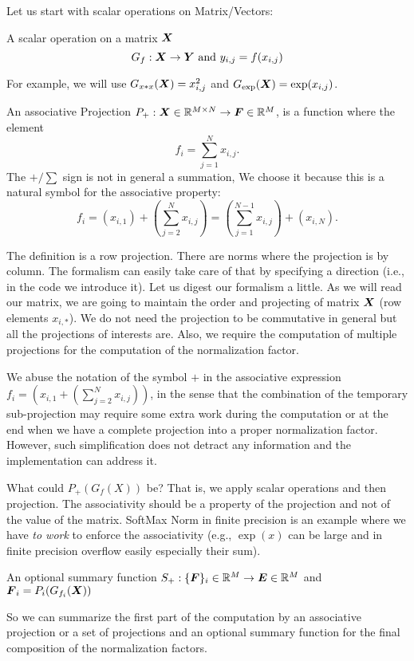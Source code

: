 \documentclass[acmsmall]{acmart}
\begin{document}
Let us start with scalar operations on Matrix/Vectors:
\begin{definition}
  A scalar operation on a matrix ${\boldsymbol X}$
  \begin{equation}
    G_f: {\boldsymbol X} \rightarrow {\boldsymbol Y} \text{ and }  y_{i,j} = f(x_{i,j})
  \end{equation}
\end{definition}

For example, we will use $G_{x*x}({\boldsymbol X}) = x_{i,j}^2$ and
$G_{\exp}({\boldsymbol X}) = \exp(x_{i,j})$. 


\begin{definition}
An associative Projection $P_+: {\boldsymbol X}\in\mathbb{R}^{M\times N} \rightarrow
{\boldsymbol F} \in \mathbb{R}^{M}$, is a function where the element
\[ f_i = \sum_{j=1}^N x_{i,j}. \]
The $+/\sum$ sign is not in general a summation, We choose it because
this is a natural symbol for the associative property:
\[
f_i = (x_{i,1}) + (\sum_{j=2}^N x_{i,j}) = (\sum_{j=1}^{N-1} x_{i,j}) + (x_{i,N}).
\]

\end{definition}
The definition is a row projection.  There are norms where the
projection is by column. The formalism can easily take care of that by
specifying a direction (i.e., in the code we introduce it).  Let us
digest our formalism a little.  As we will read our matrix, we are
going to maintain the order and projecting of matrix ${\boldsymbol X}$ (row
elements $x_{i,*}$). We do not need the projection to be commutative
in general but all the projections of interests are. Also, we require
the computation of multiple projections for the computation of the
normalization factor.

We abuse the notation of the symbol $+$ in the associative expression
$f_i = (x_{i,1} + (\sum_{j=2}^N x_{i,j}))$, in the sense that the
combination of the temporary sub-projection may require some extra
work during the computation or at the end when we have a complete
projection into a proper normalization factor. However, such
simplification does not detract any information and the implementation
can address it.

What could $P_+(G_f(X))$ be? That is, we apply scalar operations and
then projection. The associativity should be a property of the
projection and not of the value of the matrix. SoftMax Norm in finite
precision is an example where we have {\em to work} to enforce the
associativity (e.g., $\exp(x)$ can be large and in finite precision
overflow easily especially their sum).

\begin{definition}
  An optional summary function $S_+: \{{\boldsymbol F}\}_i\in\mathbb{R}^{ M}
  \rightarrow {\boldsymbol E} \in \mathbb{R}^{M}$ and  ${\boldsymbol F}_i = P_i(G_{f_i}({\boldsymbol X}))$
\end{definition}
So we can summarize the first part of the computation by an
associative projection or a set of projections and an optional summary
function for the final composition of the normalization factors.
\end{document}
